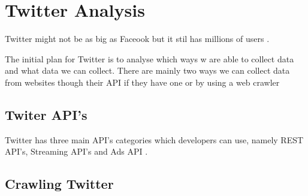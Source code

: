 \section{Twitter Analysis}\label{sec:twitter-analysis}
\ToDo
Twitter might not be as big as Faceook but it stil has millions of users
\citep{FacebookPopularity}.

The initial plan for Twitter is to analyse which ways w are able to collect data
and what data we can collect. There are mainly two ways we can collect data from
websites though their API if they have one or by using a web crawler

\subsection{Twiter API's}
Twitter has three main API's categories which developers can use, namely REST
API's, Streaming API's and Ads API \citep{TwitterDevDocs}.\nl


\subsection{Crawling Twitter}
